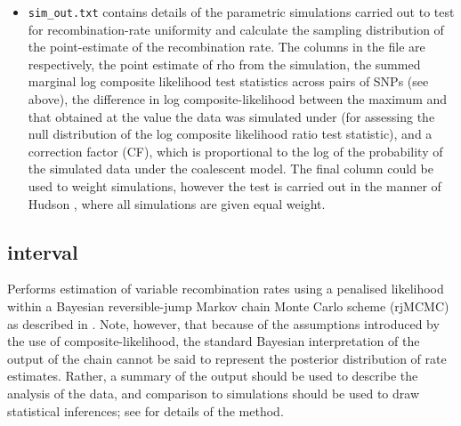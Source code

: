 \documentclass[a4paper,10pt,fullpage]{article}
\begin{document}
\begin{itemize}
\item {\verb+sim_out.txt+} contains details of the parametric
simulations carried out to test for recombination-rate uniformity
and calculate the sampling distribution of the point-estimate of
the recombination rate.  The columns in the file are respectively,
the point estimate of rho from the simulation, the summed marginal
log composite likelihood test statistics across pairs of SNPs (see
above), the difference in log composite-likelihood between the
maximum and that obtained at the value the data was simulated
under (for assessing the null distribution of the log composite
likelihood ratio test statistic), and a correction factor (CF),
which is proportional to the log of the probability of the
simulated data under the coalescent model.  The final column could
be used to weight simulations, however the test is carried out in
the manner of Hudson \cite{Hudson93}, where all simulations are
given equal weight.

\end{itemize}



\subsection{interval}
Performs estimation of variable recombination rates using a
penalised likelihood within a Bayesian reversible-jump Markov
chain Monte Carlo scheme (rjMCMC) as described in \cite{McVeanetal04}.  Note, however, that because of
the assumptions introduced by the use of composite-likelihood, the
standard Bayesian interpretation of the output of the chain cannot
be said to represent the posterior distribution of rate estimates.
Rather, a summary of the output should be used to describe the
analysis of the data, and comparison to simulations should be used
to draw statistical inferences; see \cite{McVeanetal04} for
details of the method.
\end{document}
